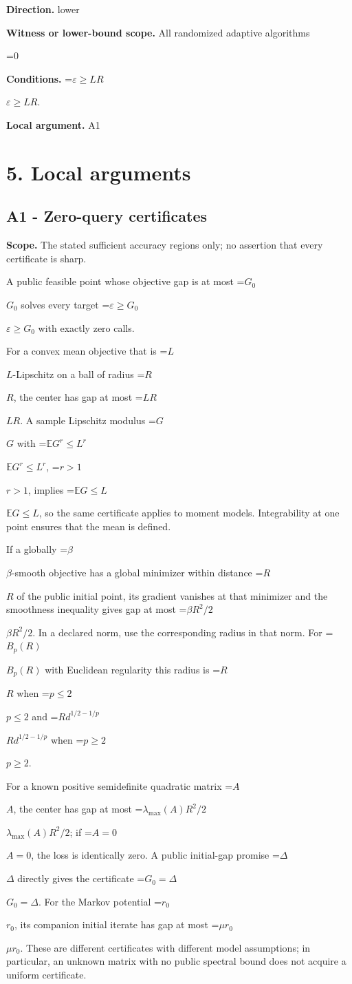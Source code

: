 \documentclass[10pt,a4paper]{article}
\newcommand{\AtlasMath}[1]{\par\begingroup\centering\setbox0=\hbox{$\displaystyle #1$}\ifdim\wd0>1.4\linewidth\typeout{ATLAS WIDE FORMULA: \the\wd0}\fi\ifdim\wd0>\linewidth\resizebox{\linewidth}{!}{\box0}\else\box0\fi\par\endgroup}
\newcommand{\AtlasInlineMath}[1]{\begingroup\setbox0=\hbox{$#1$}\ifdim\wd0>.4\linewidth\endgroup\AtlasMath{#1}\else\endgroup$#1$\fi}
\begin{document}
\textbf{Direction.} lower

\textbf{Witness or lower-bound scope.} All randomized adaptive algorithms

\AtlasMath{0}
\textbf{Conditions.} \AtlasInlineMath{\varepsilon\ge LR}.

\textbf{Local argument.} A1

\section{5. Local arguments}
\subsection{A1 - Zero-query certificates}
\textbf{Scope.} The stated sufficient accuracy regions only; no assertion that every certificate is sharp.

A public feasible point whose objective gap is at most \AtlasInlineMath{G_0} solves every target \AtlasInlineMath{\varepsilon\ge G_0} with exactly zero calls.

For a convex mean objective that is \AtlasInlineMath{L}-Lipschitz on a ball of radius \AtlasInlineMath{R}, the center has gap at most \AtlasInlineMath{LR}. A sample Lipschitz modulus \AtlasInlineMath{G} with \AtlasInlineMath{\mathbb E G^r\le L^r}, \AtlasInlineMath{r>1}, implies \AtlasInlineMath{\mathbb E G\le L}, so the same certificate applies to moment models. Integrability at one point ensures that the mean is defined.

If a globally \AtlasInlineMath{\beta}-smooth objective has a global minimizer within distance \AtlasInlineMath{R} of the public initial point, its gradient vanishes at that minimizer and the smoothness inequality gives gap at most \AtlasInlineMath{\beta R^2/2}. In a declared norm, use the corresponding radius in that norm. For \AtlasInlineMath{B_p(R)} with Euclidean regularity this radius is \AtlasInlineMath{R} when \AtlasInlineMath{p\le2} and \AtlasInlineMath{R d^{1/2-1/p}} when \AtlasInlineMath{p\ge2}.

For a known positive semidefinite quadratic matrix \AtlasInlineMath{A}, the center has gap at most \AtlasInlineMath{\lambda_{\max}(A)R^2/2}; if \AtlasInlineMath{A=0}, the loss is identically zero. A public initial-gap promise \AtlasInlineMath{\Delta} directly gives the certificate \AtlasInlineMath{G_0=\Delta}. For the Markov potential \AtlasInlineMath{r_0}, its companion initial iterate has gap at most \AtlasInlineMath{\mu r_0}. These are different certificates with different model assumptions; in particular, an unknown matrix with no public spectral bound does not acquire a uniform certificate.
\end{document}
